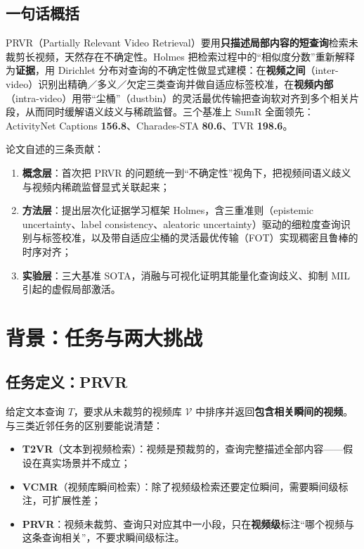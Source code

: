 \documentclass[11pt,a4paper,UTF8,fontset=windows]{ctexart}
\newcommand{\term}[1]{\textbf{#1}}
\begin{document}
\subsection{一句话概括}

PRVR（Partially Relevant Video Retrieval）要用\term{只描述局部内容的短查询}检索未裁剪长视频，天然存在不确定性。Holmes 把检索过程中的“相似度分数”重新解释为\term{证据}，用 Dirichlet 分布对查询的不确定性做显式建模：在\term{视频之间}（inter-video）识别出精确／多义／欠定三类查询并做自适应标签校准，在\term{视频内部}（intra-video）用带“尘桶”（dustbin）的灵活最优传输把查询软对齐到多个相关片段，从而同时缓解语义歧义与稀疏监督。三个基准上 SumR 全面领先：ActivityNet Captions \textbf{156.8}、Charades-STA \textbf{80.6}、TVR \textbf{198.6}。

\medskip
\noindent 论文自述的三条贡献：
\begin{enumerate}[itemsep=1pt,topsep=2pt]
  \item \term{概念层}：首次把 PRVR 的问题统一到“不确定性”视角下，把视频间语义歧义与视频内稀疏监督显式关联起来；
  \item \term{方法层}：提出层次化证据学习框架 Holmes，含三重准则（epistemic uncertainty、label consistency、aleatoric uncertainty）驱动的细粒度查询识别与标签校准，以及带自适应尘桶的灵活最优传输（FOT）实现稠密且鲁棒的时序对齐；
  \item \term{实验层}：三大基准 SOTA，消融与可视化证明其能量化查询歧义、抑制 MIL 引起的虚假局部激活。
\end{enumerate}

\section{背景：任务与两大挑战}

\subsection{任务定义：PRVR}

给定文本查询 $T$，要求从未裁剪的视频库 $\mathcal{V}$ 中排序并返回\term{包含相关瞬间的视频}。与三类近邻任务的区别要能说清楚：
\begin{itemize}[itemsep=1pt,topsep=2pt]
  \item \term{T2VR}（文本到视频检索）：视频是预裁剪的，查询完整描述全部内容——假设在真实场景并不成立；
  \item \term{VCMR}（视频库瞬间检索）：除了视频级检索还要定位瞬间，需要瞬间级标注，可扩展性差；
  \item \term{PRVR}：视频未裁剪、查询只对应其中一小段，只在\term{视频级}标注“哪个视频与这条查询相关”，不要求瞬间级标注。
\end{itemize}
\end{document}

